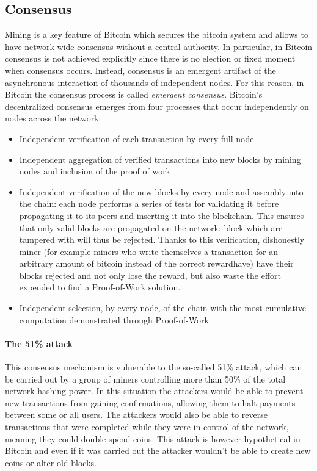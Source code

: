 \subsection{Consensus} Mining is a key feature of Bitcoin which secures the
bitcoin system and allows to have network-wide consensus without a central
authority. In particular, in Bitcoin consensus is not achieved explicitly since
there is no election or fixed moment when consensus occurs. Instead, consensus
is an emergent artifact of the asynchronous interaction of thousands of
independent nodes. For this reason, in Bitcoin the consensus process is called
\emph{emergent consensus}. Bitcoin’s decentralized consensus emerges from
four processes that occur independently on nodes across the network:
\begin{itemize}
  \item Independent verification of each transaction by every full node
  \item Independent aggregation of verified transactions into new blocks by mining
  nodes and inclusion of the proof of work
  \item Independent verification of the new blocks by every node and assembly
  into the chain: each node performs a series of tests for validating it before
  propagating it to its peers and inserting it into the blockchain.
  This ensures that only valid blocks are propagated on the network: block which
  are tampered with will thus be rejected.
  Thanks to this verification, dishonestly miner (for example miners who write
  themselves a transaction for an arbitrary amount of bitcoin instead of the correct rewardhave)
  have their blocks rejected and not only lose the reward, but also waste the
  effort expended to find a Proof-of-Work solution.
  \item Independent selection, by every node, of the chain with the most
  cumulative computation demonstrated through Proof-of-Work
\end{itemize}


\paragraph{The 51\% attack} This consensus mechanism is vulnerable to the
so-called 51\% attack, which can be carried out by a group of miners controlling
more than 50\% of the total network hashing power. In this situation the
attackers would be able to prevent new transactions from gaining confirmations,
allowing them to halt payments between some or all users. The attackers would
also be able to reverse transactions that were completed while they were in
control of the network, meaning they could double-spend coins. This attack is
however hypothetical in Bitcoin and even if it was carried out the attacker
wouldn't be able to create new coins or alter old blocks.






















